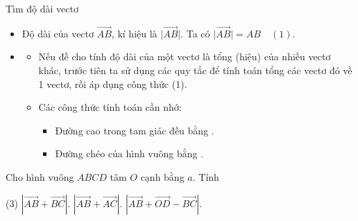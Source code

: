 \begin{dang}{Tìm độ dài vectơ}
	\begin{itemize}
		\item [\iconMT]  Độ dài của vectơ $\overrightarrow{AB}$, kí hiệu là  $\bigg|\overrightarrow{AB}\bigg|$. Ta có $\bigg|\overrightarrow{AB}\bigg|=AB \quad (1).$
		\item [\iconMT]  
		\begin{itemize}
			\item [$\bullet$] Nếu đề cho tính độ dài của một vectơ là tổng (hiệu) của nhiều vectơ khác, trước tiên ta sử dụng các quy tắc để tính toán tổng các vectơ đó về 1 vectơ, rồi áp dụng công thức (1).
			\item [$\bullet$] Các công thức tính toán cần nhớ:
			\begin{itemize}
				\item [*] Đường cao trong tam giác đều bằng .
				\item [*] Đường chéo của hình vuông bằng .
			\end{itemize}
		\end{itemize}
		\end{itemize}
\end{dang}

\begin{vd}
Cho hình vuông $ABCD$ tâm $O$ cạnh bằng $a$. Tính 
	\begin{tasks}(3)
		\task $\left| \overrightarrow{AB}+\overrightarrow{BC} \right|$.
		\task $\left| \overrightarrow{AB}+\overrightarrow{AC} \right|$.
		\task $\left|\vec{AB}+\vec{OD} -\vec{BC}\right|$.
	\end{tasks}
\end{vd} 

